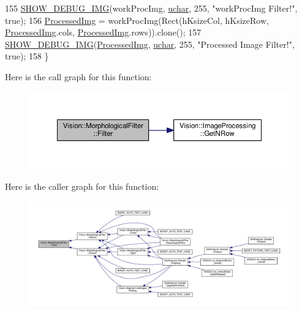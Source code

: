 \begin{DoxyCode}
155         \hyperlink{_vision_debug_8h_aae864fa4f990213a4184a209ff236202}{SHOW\_DEBUG\_IMG}(workProcImg, \hyperlink{_soil_math_types_8h_a65f85814a8290f9797005d3b28e7e5fc}{uchar}, 255, \textcolor{stringliteral}{"workProcImg Filter!"}, \textcolor{keyword}{true});
156         \hyperlink{class_vision_1_1_image_processing_aa7d65742882cd1b2a1e4e9cb68809211}{ProcessedImg} = workProcImg(Rect(hKsizeCol, hKsizeRow, 
      \hyperlink{class_vision_1_1_image_processing_aa7d65742882cd1b2a1e4e9cb68809211}{ProcessedImg}.cols, \hyperlink{class_vision_1_1_image_processing_aa7d65742882cd1b2a1e4e9cb68809211}{ProcessedImg}.rows)).clone();
157         \hyperlink{_vision_debug_8h_aae864fa4f990213a4184a209ff236202}{SHOW\_DEBUG\_IMG}(\hyperlink{class_vision_1_1_image_processing_aa7d65742882cd1b2a1e4e9cb68809211}{ProcessedImg}, \hyperlink{_soil_math_types_8h_a65f85814a8290f9797005d3b28e7e5fc}{uchar}, 255, \textcolor{stringliteral}{"Processed Image Filter!"}, \textcolor{keyword}{
      true});
158     \}
\end{DoxyCode}


Here is the call graph for this function\+:\nopagebreak
\begin{figure}[H]
\begin{center}
\leavevmode
\includegraphics[width=350pt]{class_vision_1_1_morphological_filter_ab743062372a8d0b26dabfd27451e72ed_cgraph}
\end{center}
\end{figure}




Here is the caller graph for this function\+:\nopagebreak
\begin{figure}[H]
\begin{center}
\leavevmode
\includegraphics[width=350pt]{class_vision_1_1_morphological_filter_ab743062372a8d0b26dabfd27451e72ed_icgraph}
\end{center}
\end{figure}


